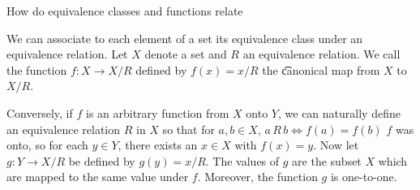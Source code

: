 

How do equivalence classes and functions relate


We can associate to each element of a set its equivalence class under an equivalence relation.
Let $X$ denote a set and $R$ an equivalence relation.
We call the function $f: X \to X/R$ defined by $f(x) = x/R$ the \t{canonical map} from  $X$ to $X/R$.

Conversely, if $f$ is an arbitrary function from $X$ onto $Y$, we can naturally define an equivalence relation $R$ in $X$ so that for $a, b \in X$, $a\,R\,b \iff f(a) = f(b)$
$f$ was onto, so for each $y \in Y$, there exists an $x \in X$ with $f(x) = y$.
Now let $g: Y \to X/R$ be defined by $g(y) = x/R$.
The values of $g$ are the subset $X$ which are mapped to the same value under $f$.
Moreover, the function $g$ is one-to-one.

\blankpage
